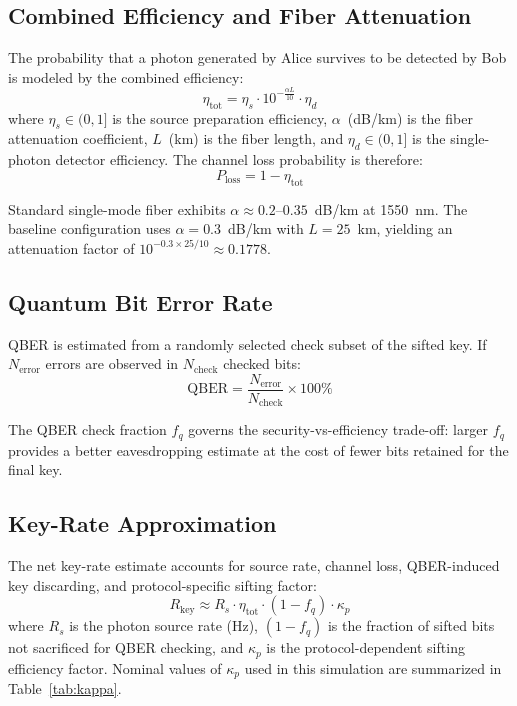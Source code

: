 \documentclass[journal]{IEEEtran}
\begin{document}
\subsection{Combined Efficiency and Fiber Attenuation}

The probability that a photon generated by Alice survives to be detected
by Bob is modeled by the combined efficiency:
\begin{equation}
  \eta_{\mathrm{tot}} = \eta_s \cdot 10^{-\frac{\alpha L}{10}} \cdot \eta_d
  \label{eq:etatot}
\end{equation}
where $\eta_s \in (0,1]$ is the source preparation efficiency,
$\alpha$~(dB/km) is the fiber attenuation coefficient,
$L$~(km) is the fiber length, and $\eta_d \in (0,1]$ is the
single-photon detector efficiency. The channel loss probability is
therefore:
\begin{equation}
  P_{\mathrm{loss}} = 1 - \eta_{\mathrm{tot}}
  \label{eq:ploss}
\end{equation}

Standard single-mode fiber exhibits $\alpha \approx 0.2$–$0.35$~dB/km
at 1550~nm. The baseline configuration uses $\alpha = 0.3$~dB/km with
$L = 25$~km, yielding an attenuation factor of
$10^{-0.3 \times 25/10} \approx 0.1778$.

\subsection{Quantum Bit Error Rate}

QBER is estimated from a randomly selected check subset of the sifted
key. If $N_{\mathrm{error}}$ errors are observed in $N_{\mathrm{check}}$
checked bits:
\begin{equation}
  \mathrm{QBER} = \frac{N_{\mathrm{error}}}{N_{\mathrm{check}}} \times 100\%
  \label{eq:qber}
\end{equation}

The QBER check fraction $f_q$ governs the security-vs-efficiency trade-off:
larger $f_q$ provides a better eavesdropping estimate at the cost of
fewer bits retained for the final key.

\subsection{Key-Rate Approximation}

The net key-rate estimate accounts for source rate, channel loss,
QBER-induced key discarding, and protocol-specific sifting factor:
\begin{equation}
  R_{\mathrm{key}} \approx R_s \cdot \eta_{\mathrm{tot}} \cdot (1 - f_q) \cdot \kappa_p
  \label{eq:keyrate}
\end{equation}
where $R_s$ is the photon source rate (Hz), $(1-f_q)$ is the fraction
of sifted bits not sacrificed for QBER checking, and $\kappa_p$ is the
protocol-dependent sifting efficiency factor. Nominal values of
$\kappa_p$ used in this simulation are summarized in
Table~\ref{tab:kappa}.
\end{document}
